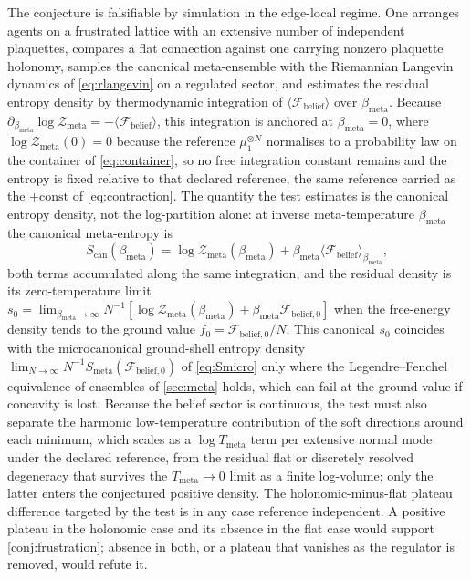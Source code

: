 \documentclass[11pt]{article}
\theoremstyle{plain}
\theoremstyle{definition}
\newcommand{\Fcal}{\mathcal{F}}
\newcommand{\Zcal}{\mathcal{Z}}
\newcommand{\Smeta}{S_{\mathrm{meta}}}
\newcommand{\Tmeta}{T_{\mathrm{meta}}}
\newcommand{\bmeta}{\beta_{\mathrm{meta}}}
\begin{document}
The conjecture is falsifiable by simulation in the edge-local regime. One arranges agents
on a frustrated lattice with an extensive number of independent plaquettes, compares a
flat connection against one carrying nonzero plaquette holonomy, samples the canonical
meta-ensemble with the Riemannian Langevin dynamics of \cref{eq:rlangevin} on a regulated
sector, and estimates the residual entropy density by thermodynamic integration of
$\langle\Fcal_{\mathrm{belief}}\rangle$ over $\bmeta$. Because
$\partial_{\bmeta}\log\Zcal_{\mathrm{meta}}=-\langle\Fcal_{\mathrm{belief}}\rangle$, this integration is
anchored at $\bmeta=0$, where $\log\Zcal_{\mathrm{meta}}(0)=0$ because the reference
$\mu_1^{\otimes N}$ normalises to a probability law on the container of \cref{eq:container}, so no
free integration constant remains and the entropy is fixed relative to that declared reference,
the same reference carried as the $+\text{const}$ of \cref{eq:contraction}. The quantity the test
estimates is the canonical entropy density, not the log-partition alone: at inverse meta-temperature
$\bmeta$ the canonical meta-entropy is
\begin{equation}
\label{eq:scan}
S_{\mathrm{can}}(\bmeta)=\log\Zcal_{\mathrm{meta}}(\bmeta)+\bmeta\langle\Fcal_{\mathrm{belief}}\rangle_{\bmeta},
\end{equation}
both terms accumulated along the same integration, and the residual density is its zero-temperature
limit $s_0=\lim_{\bmeta\to\infty}N^{-1}[\log\Zcal_{\mathrm{meta}}(\bmeta)+\bmeta\Fcal_{\mathrm{belief},0}]$
when the free-energy density tends to the ground value $f_0=\Fcal_{\mathrm{belief},0}/N$. This canonical
$s_0$ coincides with the microcanonical ground-shell entropy density
$\lim_{N\to\infty}N^{-1}\Smeta(\Fcal_{\mathrm{belief},0})$ of \cref{eq:Smicro} only where the
Legendre--Fenchel equivalence of ensembles of \cref{sec:meta} holds, which can fail at the ground
value if concavity is lost. Because the belief sector is continuous, the test must also separate the
harmonic low-temperature contribution of the soft directions around each minimum, which scales as a
$\log\Tmeta$ term per extensive normal mode under the declared reference, from the residual flat or
discretely resolved degeneracy that survives the $\Tmeta\to0$ limit as a finite log-volume; only the
latter enters the conjectured positive density. The holonomic-minus-flat plateau difference targeted
by the test is in any case reference independent.
A positive plateau in the holonomic case and its absence in the flat case would support
\cref{conj:frustration}; absence in both, or a plateau that vanishes as the regulator is removed,
would refute it.
\end{document}
